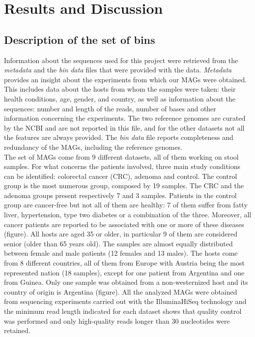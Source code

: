 \section*{Results and Discussion}

\subsection*{Description of the set of bins}

Information about the sequences used for this project were retrieved from the \textit{metadata} and the \textit{bin data} files that were provided with the data. \textit{Metadata} provides an insight about the experiments from which our MAGs were obtained. This includes data about the hosts from whom the samples were taken: their health conditions, age, gender, and country, as well as information about the sequences: number and length of the reads, number of bases and other information concerning the experiments. The two reference genomes are curated by the NCBI and are not reported in this file, and for the other datasets not all the features are always provided. The \textit{bin data} file reports completeness and redundancy of the MAGs, including the reference genomes.\\

The set of MAGs come from 9 different datasets, all of them working on stool samples. For what concerns the patients involved, three main study conditions can be identified: colorectal cancer (CRC), adenoma and control. The control group is the most numerous group, composed by 19 samples. The CRC and the adenoma groups present respectively 7 and 3 samples. Patients in the control group are cancer-free but not all of them are healthy: 7 of them suffer from fatty liver, hypertension, type two diabetes or a combination of the three. Moreover, all cancer patients are reported to be associated with one or more of these diseases (figure). All hosts are aged 35 or older, in particular 9 of them are considered senior (older than 65 years old). The samples are almost equally distributed between female and male patients (12 females and 13 males). The hosts come from 8 different countries, all of them from Europe with Austria being the most represented nation (18 samples), except for one patient from Argentina and one from Guinea. Only one sample was obtained from a non-westernized host and its country of origin is Argentina (figure). All the analyzed MAGs were obtained from sequencing experiments carried out with the IlluminaHiSeq technology and the minimum read length indicated for each dataset shows that quality control was performed and only high-quality reads longer than 30 nucleotides were retained.\\

